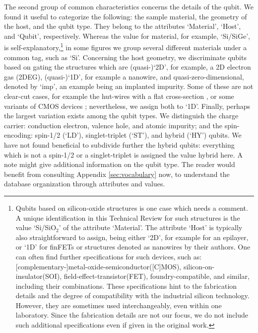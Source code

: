\documentclass[aps, prx, showpacs, twocolumn, superscriptaddress, notitlepage, longbibliography, floatfix, nofootinbib]{revtex4-2}
\newcommand{\myKey}[1]{$\whitearrowupfrombar$\textit{#1}}
\renewcommand{\myKey}[1]{\textit{#1}}
\renewcommand{\myKey}[1]{`{#1}'}
\begin{document}
The second group of common characteristics concerns the details of the qubit. We found it useful to categorize the following: the sample material, the geometry of the host, and the qubit type. They belong to the attributes \myKey{Material}, \myKey{Host}, and \myKey{Qubit}, respectively. Whereas the value for material, for example, \myKey{Si/SiGe}, is self-explanatory,\footnote{Qubits based on silicon-oxide structures is one case which needs a comment. A unique identification in this Technical Review for such structures is the value \myKey{Si/SiO$_2$} of the attribute \myKey{Material}. The attribute \myKey{Host} is typically also straightforward to assign, being either \myKey{2D}, for example for an epilayer, or \myKey{1D} for finFETs or structures denoted as nanowires by their authors. One can often find further specifications for such devices, such as: [complementary-]metal-oxide-semiconductor([C]MOS), silicon-on-insulator(SOI), field-effect-transistor(FET), foundry-compatible, and similar, including their combinations. These specifications hint to the fabrication details and the degree of compatibility with the industrial silicon technology. However, they are sometimes used interchangeably, even within one laboratory. Since the fabrication details are not our focus, we do not include such additional specifications even if given in the original work.}
 in some figures we group several different materials under a common tag, such as \myKey{Si}. Concerning the host geometry, we discriminate qubits based on gating the structures which are (quasi-)\myKey{2D}, for example, a 2D electron gas (2DEG), (quasi-)\myKey{1D}, for example a nanowire, and quasi-zero-dimensional, denoted by \myKey{imp}, an example being an implanted impurity. Some of these are not clear-cut cases, for example the hut-wires with a flat cross-section \cite{watzinger_heavy-hole_2016}, or some variants of CMOS devices \cite{voisin_electrical_2016}; nevertheless, we assign both to \myKey{1D}. Finally, perhaps the largest variation exists among the qubit types. We distinguish the charge carrier: conduction electron, valence hole, and atomic impurity; and the spin-encoding: spin-1/2 (\myKey{LD}), singlet-triplet (\myKey{ST}), and hybrid (\myKey{HY}) qubits. We have not found beneficial to subdivide further the hybrid qubits: everything which is not a spin-1/2 or a singlet-triplet is assigned the value hybrid here. A note might give additional information on the qubit type. The reader would benefit from consulting Appendix \ref{sec:vocabulary} now, to understand the database organization through attributes and values.
\end{document}
